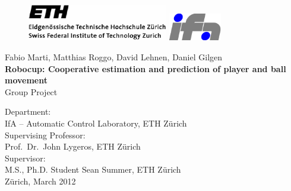 \begin{titlepage}
\begin{center}

\begin{figure}[!ht]
\begin{center}
\centerline{ \includegraphics[height=16mm]{./Pictures/ethz_logo}
              \hspace{25mm}
	    \includegraphics[height=12mm]{./Pictures/ifalogo_color}}
\end{center}
\end{figure}

\vspace*{20mm}

{Fabio Marti},
{Matthias Roggo},
{David Lehnen},
{Daniel Gilgen}\\

\vspace{10mm} {\LARGE \bf Robocup: Cooperative estimation and prediction of player and ball movement \\} \vspace{10mm}
{Group Project} \\

\vspace{50mm}

Department: \\
IfA -- Automatic Control Laboratory, ETH Z\"urich \\

\vspace{5mm}
Supervising Professor: \\
Prof.~Dr.~John Lygeros, ETH Z\"urich \\

\vspace{5mm}
Supervisor: \\
M.S., Ph.D. Student Sean Summer, ETH Z\"urich \\

\vspace{10mm}
Z\"urich, March 2012

\end{center}
\end{titlepage}
